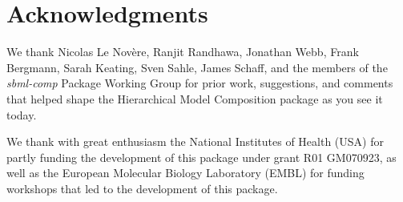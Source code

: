 
\section{Acknowledgments}

We thank Nicolas Le Nov\`{e}re, Ranjit Randhawa, Jonathan Webb, Frank
Bergmann, Sarah Keating, Sven Sahle, James Schaff, and the members of
the \emph{sbml-comp} Package Working Group for prior work, suggestions,
and comments that helped shape the Hierarchical Model Composition
package as you see it today.

We thank with great enthusiasm the National Institutes of Health (USA)
for partly funding the development of this package under grant R01
GM070923, as well as the European Molecular Biology Laboratory (EMBL)
for funding workshops that led to the development of this package.
